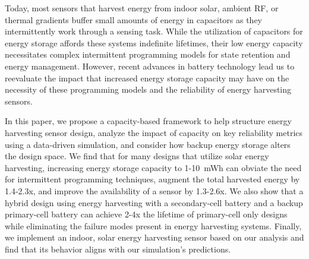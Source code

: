 
%
Today, most sensors that harvest energy
from indoor solar, ambient RF, or thermal gradients
buffer small amounts of energy in capacitors as they intermittently work through a sensing task.
%
While the utilization of capacitors for energy storage affords these systems
indefinite lifetimes, their low energy capacity
necessitates complex intermittent programming models for state retention and
energy management.
%
However, recent advances in battery technology lead us to reevaluate the impact
that increased energy storage capacity may have on the necessity of these
programming models and the reliability of energy harvesting sensors.

In this paper, we propose a capacity-based framework to help structure
energy harvesting sensor design,
analyze the impact of capacity on key reliability metrics
using a data-driven simulation, and
consider how backup energy storage alters the design space.
%
We find that for many designs that utilize solar energy harvesting, increasing
energy storage capacity to 1-10~mWh can obviate the need for intermittent
programming techniques, augment the total harvested energy by 1.4-2.3x, and
improve the availability of a sensor by 1.3-2.6x.  We also show that a hybrid
design using energy harvesting with a secondary-cell battery and a backup
primary-cell battery can achieve 2-4x the lifetime of primary-cell only designs
while eliminating the failure modes present in energy harvesting systems.
%
%
%
Finally, we implement an indoor, solar energy harvesting sensor based on
our analysis and find that its behavior aligns with
our simulation's predictions.



